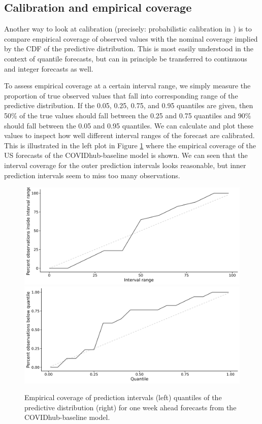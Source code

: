 \documentclass[
]{book}
\begin{document}
\hypertarget{calibration-and-empirical-coverage}{%
\subsection{Calibration and empirical coverage}\label{calibration-and-empirical-coverage}}

Another way to look at calibration (precisely: probabilistic calibration in \citet{gneitingProbabilisticForecastsCalibration2007}) is to compare empirical coverage of observed values with the nominal coverage implied by the CDF of the predictive distribution. This is most easily understood in the context of quantile forecasts, but can in principle be transferred to continuous and integer forecasts as well.

To assess empirical coverage at a certain interval range, we simply measure the proportion of true observed values that fall into corresponding range of the predictive distribution. If the 0.05, 0.25, 0.75, and 0.95 quantiles are given, then 50\% of the true values should fall between the 0.25 and 0.75 quantiles and 90\% should fall between the 0.05 and 0.95 quantiles. We can calculate and plot these values to inspect how well different interval ranges of the forecast are calibrated. This is illustrated in the left plot in Figure \ref{fig:coverage} where the empirical coverage of the US forecasts of the COVIDhub-baseline model is shown. We can seen that the interval coverage for the outer prediction intervals looks reasonable, but inner prediction intervals seem to miss too many observations.

\begin{figure}
\includegraphics[width=0.5\linewidth]{../visualisation/chapter-3-evaluation/interval-coverage} \includegraphics[width=0.5\linewidth]{../visualisation/chapter-3-evaluation/quantile-coverage} \caption{Empirical coverage of prediction intervals (left) quantiles of the predictive distribution (right) for one week ahead forecasts from the COVIDhub-baseline model.}\label{fig:coverage}
\end{figure}
\end{document}
